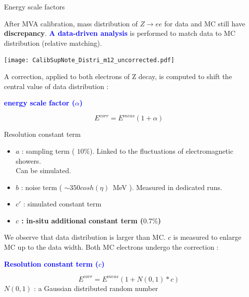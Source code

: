 \begin{frame}{Energy scale factors}
  \begin{minipage}{0.49\linewidth}
    After MVA calibration, mass distribution of $Z\rightarrow ee$ for data and MC still have {\bf discrepancy}.
    \newline
    \textcolor{blue}{\bf A data-driven analysis } is performed to match data to MC distribution (relative matching).
  \end{minipage}
  \hfill
  \begin{minipage}{0.49\linewidth}
    \texttt{[image: CalibSupNote\_Distri\_m12\_uncorrected.pdf]}
  \end{minipage}

A correction, applied to both electrons of Z decay, is computed to shift the central value of data distribution : 
\begin{center} \textcolor{blue}{\bf energy scale factor ($\alpha$)} \end{center}
$$E^{corr}=E^{meas}(1+\alpha)$$
\end{frame}

\begin{frame}{Resolution constant term}
  
  \begin{itemize}
  \item $a$ : sampling term ( $10\%$). Linked to the fluctuations of electromagnetic showers. \\Can be simulated.
  \item $b$ : noise term ( $\sim 350cosh(\eta )$~MeV ). Measured in dedicated runs.
  \item $c'$ : simulated constant term
  \item {\bf $c$ : in-situ additional constant term ($0.7\%$)}
  \end{itemize}
  We observe that data distribution is larger than MC. 
  $c$ is measured to enlarge MC up to the data width.
  Both MC electrons undergo the correction :
  \begin{center}\textcolor{blue}{\bf Resolution constant term ($c$) }\end{center}
  $$E^{corr} = E^{meas}(1+N(0,1)*c)$$
  $N(0,1)$ : a Gaussian distributed random number
\end{frame}

